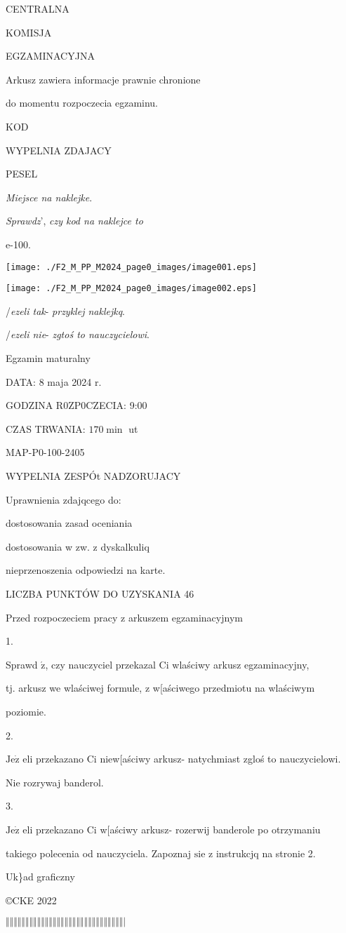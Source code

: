 \documentclass[a4paper,12pt]{article}
\begin{document}
CENTRALNA

KOMISJA

EGZAMINACYJNA

Arkusz zawiera informacje prawnie chronione

do momentu rozpoczecia egzaminu.

KOD

WYPELNIA ZDAJACY

PESEL

{\it Miejsce na naklejke}.

{\it Sprawdz}', {\it czy kod na naklejce to}

e-100.
\begin{center}
\texttt{[image: ./F2\_M\_PP\_M2024\_page0\_images/image001.eps]}

\texttt{[image: ./F2\_M\_PP\_M2024\_page0\_images/image002.eps]}
\end{center}
/{\it ezeli tak}- {\it przyklej naklejkq}.

/{\it ezeli nie}- {\it zgtoś to nauczycielowi}.

Egzamin maturalny

DATA: 8 maja 2024 r.

GODZINA R0ZP0CZECIA: 9:00

CZAS TRWANIA: $170 \displaystyle \min$ ut

MAP-P0-100-2405

WYPELNIA ZESPÓt NADZORUJACY

Uprawnienia zdajqcego do:

\fbox{} dostosowania zasad oceniania

\fbox{} dostosowania w zw. z dyskalkuliq

\fbox{} nieprzenoszenia odpowiedzi na karte.

LICZBA PUNKTÓW DO UZYSKANIA 46

Przed rozpoczeciem pracy z arkuszem egzaminacyjnym

1.

Sprawd $\acute{\mathrm{z}}$, czy nauczyciel przekazal Ci wlaściwy arkusz egzaminacyjny,

tj. arkusz we wlaściwej formule, z w[aściwego przedmiotu na wlaściwym

poziomie.

2.

$\mathrm{J}\mathrm{e}\dot{\mathrm{z}}$ eli przekazano Ci niew[aściwy arkusz- natychmiast zgloś to nauczycielowi.

Nie rozrywaj banderol.

3.

$\mathrm{J}\mathrm{e}\dot{\mathrm{z}}$ eli przekazano Ci w[aściwy arkusz- rozerwij banderole po otrzymaniu

takiego polecenia od nauczyciela. Zapoznaj $\mathrm{s}\mathrm{i}\mathrm{e}$ z instrukcjq na stronie 2.

Uk\}ad graficzny

\copyright CKE 2022

$\Vert\Vert\Vert\Vert\Vert\Vert\Vert\Vert\Vert\Vert\Vert\Vert\Vert\Vert\Vert\Vert\Vert\Vert\Vert\Vert\Vert\Vert\Vert\Vert\Vert\Vert\Vert\Vert\Vert\Vert|$
\end{document}
